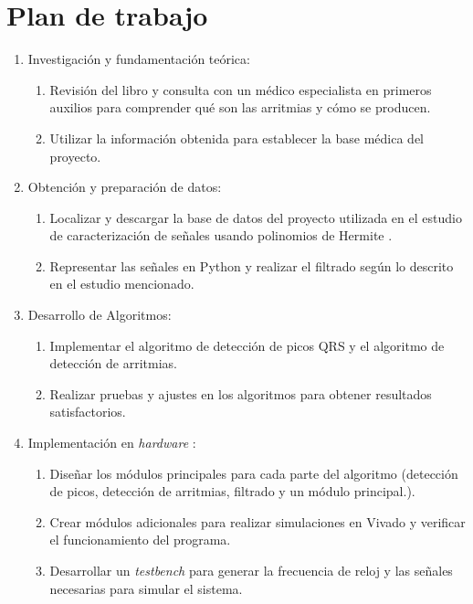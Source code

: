 \section{Plan de trabajo}
\begin{enumerate}
	\item Investigación y fundamentación teórica:
	
	\begin{enumerate}
		\item Revisión del libro\cite{velez} y consulta con un médico especialista en primeros auxilios para comprender qué son las arritmias y cómo se producen.
	
		\item Utilizar la información obtenida para establecer la base médica del proyecto.
	\end{enumerate}

	\item Obtención y preparación de datos:
	\begin{enumerate}
		\item Localizar y descargar la base de datos del proyecto utilizada en el estudio de caracterización de señales usando polinomios de Hermite \cite{desai2021low}.

		\item Representar las señales en Python y realizar el filtrado según lo descrito en el estudio mencionado.
	\end{enumerate}
	\item Desarrollo de Algoritmos:
	\begin{enumerate}
		\item Implementar el algoritmo de detección de picos QRS y el algoritmo de detección de arritmias.

		\item Realizar pruebas y ajustes en los algoritmos para obtener resultados satisfactorios.
	\end{enumerate}
	
	\item Implementación en  \textit{hardware} : 
	\begin{enumerate}
		\item Diseñar los módulos principales para cada parte del algoritmo (detección de picos, detección de arritmias, filtrado y un módulo principal.).

		\item Crear módulos adicionales para realizar simulaciones en Vivado y verificar el funcionamiento del programa.
		\item Desarrollar un \textit{testbench} para generar la frecuencia de reloj y las señales necesarias para simular el sistema.
	\end{enumerate}


\end{enumerate}
